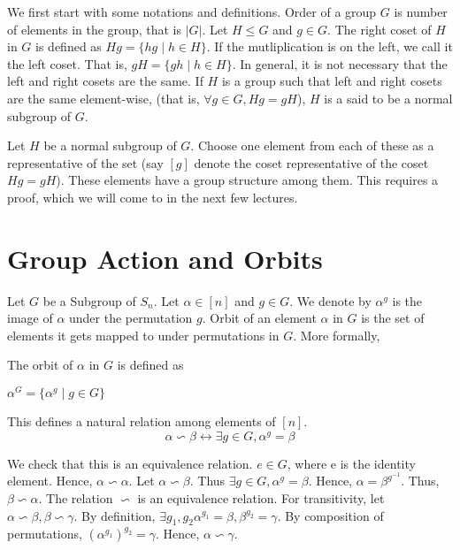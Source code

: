
We first start with some notations and definitions. Order of a group $G$ is number of elements in the group, that is $|G|$. Let $H \le G$ and $g \in G$. The right coset of $H$ in $G$ is defined as 
$Hg = \{hg \mid h \in H\}$. If the mutliplication is on the left, we call it the left coset. That is, $gH = \{gh \mid h \in H\}$. In general, it is not necessary that the left and right cosets are the same.
If $H$ is a group such that left and right cosets are the same element-wise, (that is, $\forall g \in G, Hg= gH$), $H$ is a said to be a normal subgroup of $G$.

Let $H$ be a normal subgroup of $G$. Choose one element from each of these as a representative of the set (say $[g]$ denote the coset representative of the coset $Hg = gH$). These elements have a group structure among them. This requires a proof, which we will come to in the next few lectures.

\section{Group Action and Orbits}

Let $G$ be a Subgroup of $S_n$. Let $\alpha \in [n]$ and $g \in G$. We denote by $\alpha^g$ is the image of $\alpha$ under the permutation $g$. 
Orbit of an element $\alpha$ in $G$ is the set of elements it gets mapped to under permutations in $G$. More formally,

\begin{definition}
The orbit of $\alpha$ in $G$ is defined as
\begin{center}
$\alpha^G = \{\alpha^g \mid g \in G\}$
\end{center}
\end{definition}

This defines a natural relation among elements of $[n]$.
$$\alpha \backsim \beta \leftrightarrow \exists g \in G, \alpha^g = \beta$$

We check that this is an equivalence relation. $e \in G$, where e is the identity element. Hence, $\alpha \backsim \alpha$. Let $\alpha \backsim \beta$. Thus $\exists g \in G, \alpha^g = \beta$. Hence, $\alpha = \beta^{g^{-1}}$. Thus, $\beta \backsim \alpha$. The relation $\backsim$ is an equivalence relation. For transitivity, let $\alpha \backsim \beta, \beta \backsim \gamma$. By definition, $\exists g_1, g_2 \alpha^{g_1} = \beta, \beta^{g_2} = \gamma$. By composition of permutations, $(\alpha^{g_1})^{g_2} = \gamma$. Hence, $\alpha \backsim \gamma$.

